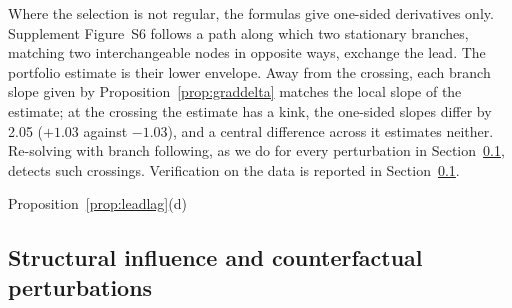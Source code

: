 Where the selection is not regular, the formulas give one-sided derivatives only. Supplement Figure~S6 follows a path along which two stationary branches, matching two interchangeable nodes in opposite ways, exchange the lead. The portfolio estimate is their lower envelope. Away from the crossing, each branch slope given by Proposition~\ref{prop:graddelta} matches the local slope of the estimate; at the crossing the estimate has a kink, the one-sided slopes differ by 2.05 ($+1.03$ against $-1.03$), and a central difference across it estimates neither. Re-solving with branch following, as we do for every perturbation in Section~\ref{sec:influence}, detects such crossings. Verification on the data is reported in Section~\ref{sec:influence}.


Proposition~\ref{prop:leadlag}(d)

\subsection{Structural influence and counterfactual perturbations}\label{sec:influence}

